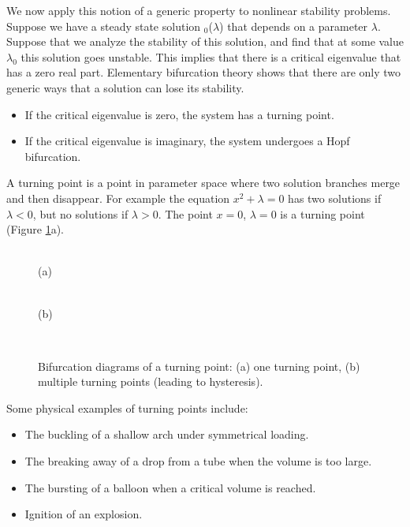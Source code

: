 We now apply this notion of a generic property to nonlinear
stability problems.
Suppose we have a steady state solution \bfx$_0$($\lambda$) that
depends on a parameter $\lambda$.  Suppose that we analyze the
stability of this solution, and find that at 
some value $\lambda_0$ this solution goes unstable.  This
implies that there is a critical eigenvalue that has a 
zero real part.
Elementary bifurcation theory shows that there are only two 
generic ways that  a solution can lose its stability.   

\begin{itemize}
\item  If the  critical eigenvalue  is zero, the system 
has a turning point.
\item If the critical eigenvalue is imaginary, the system
undergoes a Hopf bifurcation.
\end{itemize}

A turning point is a point in parameter space where   two
solution branches merge and then disappear.  For example
the equation $x^2 + \lambda=0$ has two solutions if $\lambda<0$, but
no solutions if $\lambda>0$.  The point $x=0$, $\lambda=0$ is 
a turning point (Figure \ref{fig:turningpoint}a).
\begin{figure}[tb]
 \begin{minipage}{0.5\linewidth}
  \centering{} \\
  (a) 
 \end{minipage} \hfill
 \begin{minipage}{0.5\linewidth}
  \centering{} \\
  (b)
 \end{minipage} \\
  \caption{Bifurcation diagrams of a turning point: (a) one turning point, (b) multiple turning points (leading to hysteresis).}
 \label{fig:turningpoint}
\end{figure} Some physical examples of turning points include:
\begin{itemize}
\item  The buckling of a shallow arch under symmetrical loading.
\item  The breaking away of a drop from a tube when the volume
is too large.
\item  The bursting of a balloon when a critical volume is reached.
\item Ignition of an explosion.
\end{itemize}


